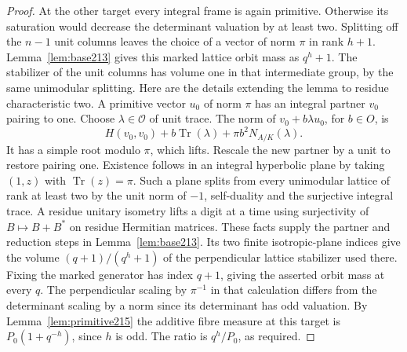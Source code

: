 \documentclass[a4paper,11pt]{article}
\theoremstyle{definition}
\theoremstyle{remark}
\numberwithin{equation}{section}
\begin{document}
\begin{proof}
At the other target every integral frame is again primitive.
Otherwise its saturation would decrease the determinant valuation
by at least two. Splitting off the \(n-1\) unit columns leaves
the choice of a vector of norm \(\pi\) in rank \(h+1\).
Lemma~\ref{lem:base213} gives this marked lattice orbit mass
as \(q^h+1\). The stabilizer of the unit columns has volume one
in that intermediate group, by the same unimodular splitting.
Here are the details extending the lemma to residue characteristic
two. A primitive vector \(u_0\) of norm \(\pi\) has an integral
partner \(v_0\) pairing to one. Choose \(\lambda\in\mathcal O\)
of unit trace. The norm of \(v_0+b\lambda u_0\), for \(b\in O\),
is
\[
 H(v_0,v_0)+b\operatorname{Tr}(\lambda)+\pi b^2N_{A/K}(\lambda).
\]
It has a simple root modulo \(\pi\), which lifts. Rescale the
new partner by a unit to restore pairing one. Existence follows
in an integral hyperbolic plane by taking \((1,z)\) with
\(\operatorname{Tr}(z)=\pi\). Such a plane splits from every
unimodular lattice of rank at least two by the unit norm of
\(-1\), self-duality and the surjective integral trace. A residue
unitary isometry lifts a digit at a time using surjectivity of
\(B\mapsto B+B^*\) on residue Hermitian matrices. These facts
supply the partner and reduction steps in Lemma~\ref{lem:base213}.
Its two finite isotropic-plane indices give the volume
\((q+1)/(q^h+1)\) of the perpendicular lattice stabilizer used
there. Fixing the marked generator has index \(q+1\), giving
the asserted orbit mass at every \(q\). The perpendicular
scaling by \(\pi^{-1}\) in that calculation differs from the
determinant scaling by a norm since its determinant has odd
valuation. By Lemma~\ref{lem:primitive215} the additive fibre
measure at this target is \(P_0(1+q^{-h})\), since \(h\) is odd.
The ratio is \(q^h/P_0\), as required.
\end{proof}
\end{document}
